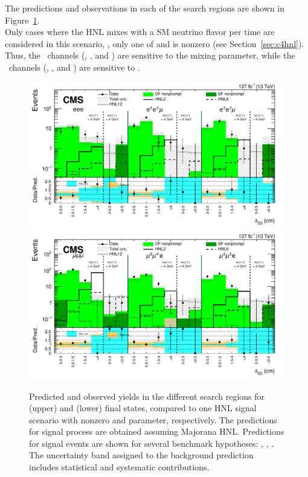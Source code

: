 The predictions and observations in each of the search regions are
shown in Figure~\ref{fig:finalyields_majorana_datacards}.\\
Only cases where the HNL mixes with a SM neutrino
flavor per time are considered in this scenario, \ie, only one of \mixpare and \mixparm is
nonzero (see Section~\ref{sec:c4hnl}).
Thus, the \eex~channels (\EEE, \EEMos, and
\EEMss) are sensitive to the \mixpare mixing
parameter, while the \mmx~channels (\MMM, \MMEos, and
\MMEss) are sensitive to \mixparm.

\begin{figure}[h!]
    \centering
    \includegraphics[width=.98\textwidth]{Figures/c6/results/ele_sr.pdf} \\
    \includegraphics[width=.98\textwidth]{Figures/c6/results/mu_sr.pdf}
    \caption{\label{fig:finalyields_majorana_datacards}
        Predicted and observed yields in the different search
        regions for (upper) \eex and (lower) \mmx final states,
        compared to one HNL signal scenario with nonzero \mixpare and
        \mixparm parameter, respectively. The predictions for signal
        process are obtained assuming Majorana HNL.
        Predictions for signal events are shown for several benchmark hypotheses:
        \HNLtwo, \HNLsix, \HNLtwelve.
        The uncertainty band assigned to the background prediction includes
        statistical and systematic contributions.
    }
\end{figure}

